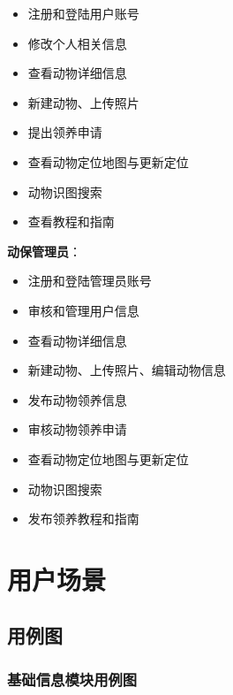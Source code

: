 \documentclass[12pt,a4paper,UTF8]{article}
\begin{document}
\begin{itemize}[topsep=2pt, partopsep=0pt]
  \item 注册和登陆用户账号
  \item 修改个人相关信息
  \item 查看动物详细信息
  \item 新建动物、上传照片
  \item 提出领养申请
  \item 查看动物定位地图与更新定位
  \item 动物识图搜索
  \item 查看教程和指南
\end{itemize}

\vspace{0.25cm} %

\noindent\textbf{动保管理员}：

\begin{itemize}
  \item 注册和登陆管理员账号
  \item 审核和管理用户信息
  \item 查看动物详细信息
  \item 新建动物、上传照片、编辑动物信息
  \item 发布动物领养信息
  \item 审核动物领养申请
  \item 查看动物定位地图与更新定位
  \item 动物识图搜索
  \item 发布领养教程和指南
\end{itemize}


\section{用户场景}

\subsection{用例图}

\subsubsection{基础信息模块用例图}
\end{document}
